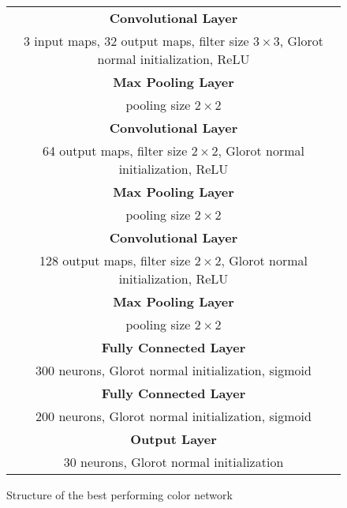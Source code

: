 \begin{figure}[h!]
	\scriptsize
	\centering
	\begin{tabular}{|c|}
	\hline
		\textbf{Convolutional Layer}\\
		3 input maps, 32 output maps, filter size $3\times3$, Glorot normal initialization, \ac{ReLU}\\
	\hline
		\textbf{Max Pooling Layer}\\
		pooling size $2\times2$\\
	\hline
		\textbf{Convolutional Layer}\\
		64 output maps, filter size $2\times2$, Glorot normal initialization, \ac{ReLU}\\
	\hline
		\textbf{Max Pooling Layer}\\
		pooling size $2\times2$\\
	\hline
		\textbf{Convolutional Layer}\\
		128 output maps, filter size $2\times2$, Glorot normal initialization, \ac{ReLU}\\
	\hline	
		\textbf{Max Pooling Layer}\\
		pooling size $2\times2$\\
	\hline
		\textbf{Fully Connected Layer}\\
		300 neurons, Glorot normal initialization, sigmoid\\
	\hline
		\textbf{Fully Connected Layer}\\
		200 neurons, Glorot normal initialization, sigmoid\\
	\hline
		\textbf{Output Layer}\\
		30 neurons, Glorot normal initialization\\
	\hline
	\end{tabular}
	\caption{Structure of the best performing color network}
	\label{fig:structure_of_the_best_color_network}
\end{figure}
